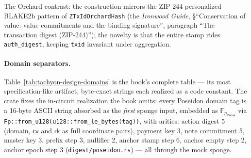 \documentclass[11pt,a4paper]{article}
\theoremstyle{definition}
\newcommand{\F}{\mathbb{F}}
\newcommand{\cvsym}{\mathsf{cv}}
\newcommand{\rk}{\mathsf{rk}}
\newcommand{\Pallas}{\ensuremath{\mathsf{Pallas}}}
\begin{document}
The Orchard contrast: the construction mirrors the ZIP-244
personalized-BLAKE2b pattern of \texttt{ZTxIdOrchardHash} (the
\emph{Ironwood Guide}, \S``Conservation of value: value commitments and the
binding signature'', paragraph ``The transaction digest (ZIP-244)''); the
novelty is that the entire stamp rides \texttt{auth\_digest}, keeping
\texttt{txid} invariant under aggregation.

\paragraph{Domain separators.} Table~\ref{tab:tachyon-design-domains} is
the book's complete table --- its most specification-like artifact,
byte-exact strings each realized as a code constant. The crate fixes the
in-circuit realization the book omits: every Poseidon domain tag is a
16-byte ASCII string absorbed as the \emph{first} sponge input, embedded
as $\F_{p_{\Pallas}}$ via
\texttt{Fp::from\_u128(u128::from\_le\_bytes(tag))}, with arities: action
digest 5 (domain, $\cvsym$ and $\rk$ as full coordinate pairs), payment
key 3, note commitment 5, master key 3, prefix step 3, nullifier 2, anchor
stamp step 6, anchor empty step 2, anchor epoch step 3
(\texttt{digest/poseidon.rs}) --- all through the mock sponge.
\end{document}
